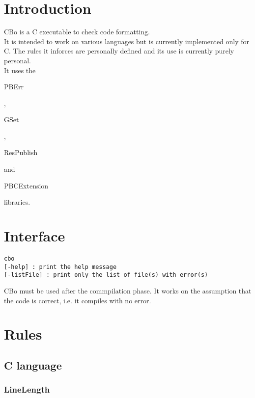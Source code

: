 \section*{Introduction}

CBo is a C executable to check code formatting.\\

It is intended to work on various languages but is currently implemented only for C. The rules it inforces are personally defined and its use is currently purely personal.\\

It uses the \begin{ttfamily}PBErr\end{ttfamily}, \begin{ttfamily}GSet\end{ttfamily}, \begin{ttfamily}ResPublish\end{ttfamily} and \begin{ttfamily}PBCExtension\end{ttfamily} libraries.\\

\section{Interface}

\begin{scriptsize}
\begin{ttfamily}
\begin{lstlisting}
cbo
[-help] : print the help message
[-listFile] : print only the list of file(s) with error(s)
\end{lstlisting}
\end{ttfamily}
\end{scriptsize}

CBo must be used after the commpilation phase. It works on the assumption that the code is correct, i.e. it compiles with no error.\\

\section{Rules}

\subsection{C language}

\subsubsection{LineLength}


